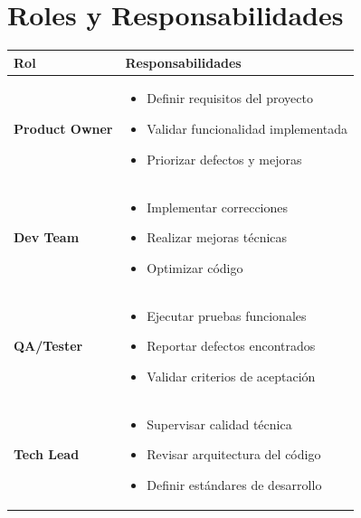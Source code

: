 \documentclass[12pt,a4paper]{report}
\begin{document}
\section{Roles y Responsabilidades}

\begin{table}[h]
    \centering
    \begin{tabular}{|l|p{10cm}|}
        \hline
        \rowcolor{grisClaro}
        \textbf{Rol} & \textbf{Responsabilidades} \\
        \hline
        \textbf{Product Owner} & 
            \begin{itemize}
                \item Definir requisitos del proyecto
                \item Validar funcionalidad implementada
                \item Priorizar defectos y mejoras
            \end{itemize} \\
        \hline
        \textbf{Dev Team} & 
            \begin{itemize}
                \item Implementar correcciones
                \item Realizar mejoras técnicas
                \item Optimizar código
            \end{itemize} \\
        \hline
        \textbf{QA/Tester} & 
            \begin{itemize}
                \item Ejecutar pruebas funcionales
                \item Reportar defectos encontrados
                \item Validar criterios de aceptación
            \end{itemize} \\
        \hline
        \textbf{Tech Lead} & 
            \begin{itemize}
                \item Supervisar calidad técnica
                \item Revisar arquitectura del código
                \item Definir estándares de desarrollo
            \end{itemize} \\
        \hline
    \end{tabular}
\end{table}
\end{document}
